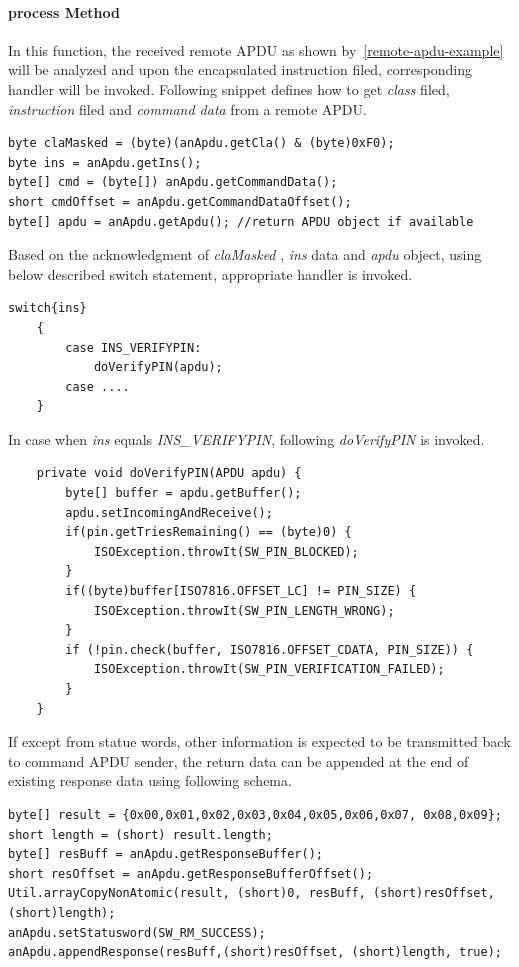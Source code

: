 \paragraph{process Method}
In this function, the received remote APDU as shown by~\ref{remote-apdu-example} will be analyzed and upon the encapsulated instruction filed, corresponding handler will be invoked. Following snippet defines how to get \emph{class} filed, \emph{instruction} filed  and \emph{command data} from a remote APDU.
{\small
\begin{verbatim}
byte claMasked = (byte)(anApdu.getCla() & (byte)0xF0);
byte ins = anApdu.getIns();
byte[] cmd = (byte[]) anApdu.getCommandData();	    
short cmdOffset = anApdu.getCommandDataOffset();
byte[] apdu = anApdu.getApdu(); //return APDU object if available
\end{verbatim}
}

Based on the acknowledgment of \emph{claMasked} , \emph{ins} data and \emph{apdu} object, using below described switch statement, appropriate handler is invoked.
{\small
\begin{verbatim}
switch{ins}
	{
		case INS_VERIFYPIN:
			doVerifyPIN(apdu);
		case ....
	}
\end{verbatim}
}
In case when \emph{ins} equals \emph{INS\_VERIFYPIN}, following \emph{doVerifyPIN} is invoked.
{\small
\begin{verbatim}
	private void doVerifyPIN(APDU apdu) {
		byte[] buffer = apdu.getBuffer();
		apdu.setIncomingAndReceive();			
		if(pin.getTriesRemaining() == (byte)0) {
			ISOException.throwIt(SW_PIN_BLOCKED);
		}
		if((byte)buffer[ISO7816.OFFSET_LC] != PIN_SIZE) {
			ISOException.throwIt(SW_PIN_LENGTH_WRONG);
		}		
		if (!pin.check(buffer, ISO7816.OFFSET_CDATA, PIN_SIZE)) {
			ISOException.throwIt(SW_PIN_VERIFICATION_FAILED);
		}
	}
\end{verbatim}
}
If except from statue words, other information is expected to be transmitted back to command APDU sender,  the return data can be appended at the end of existing response data using following schema.
{\small
\begin{verbatim}
byte[] result = {0x00,0x01,0x02,0x03,0x04,0x05,0x06,0x07, 0x08,0x09};
short length = (short) result.length;
byte[] resBuff = anApdu.getResponseBuffer(); 
short resOffset = anApdu.getResponseBufferOffset();
Util.arrayCopyNonAtomic(result, (short)0, resBuff, (short)resOffset, (short)length);	    
anApdu.setStatusword(SW_RM_SUCCESS);
anApdu.appendResponse(resBuff,(short)resOffset, (short)length, true);
\end{verbatim}
}

